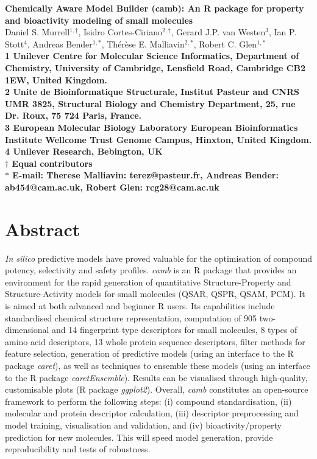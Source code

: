 \documentclass[twoside,a4wide,10pt]{article}
\date{}
\begin{document}
\begin{flushleft}
{\Large
\textbf{Chemically Aware Model Builder (camb): An R package for property and bioactivity modeling of small molecules}
}
\\

Daniel S. Murrell$^{1,\dag}$,
Isidro Cortes-Ciriano$^{2,\dag}$,
Gerard J.P. van Westen$^{3}$,
Ian P. Stott$^{4}$,
Andreas Bender$^{1,\ast}$,
Th\'er\`ese E. Malliavin$^{2,\ast}$,
Robert C. Glen$^{1,\ast}$\\

\bf{1} Unilever Centre for Molecular Science Informatics, Department of Chemistry, University of Cambridge, Lensfield Road, Cambridge CB2 1EW, United Kingdom.
\\
\bf{2} Unite de Bioinformatique Structurale, Institut Pasteur and CNRS UMR 3825, Structural Biology and Chemistry Department, 25, rue Dr. Roux, 75 724 Paris, France.
\\
\bf{3} European Molecular Biology Laboratory European Bioinformatics Institute Wellcome Trust Genome Campus, Hinxton, United Kingdom.
\\
\bf{4} Unilever Research, Bebington, UK
\\
$\dag$ Equal contributors\\
$\ast$ E-mail: Therese Malliavin: terez@pasteur.fr, Andreas Bender: ab454@cam.ac.uk, Robert Glen: rcg28@cam.ac.uk


\end{flushleft}







\section*{Abstract}

{\it In silico} predictive models have proved valuable for the optimisation of compound potency, selectivity and safety profiles.
{\it camb} is an R package that provides an environment for the rapid generation of quantitative Structure-Property and Structure-Activity models for small molecules (QSAR, QSPR, QSAM, PCM). 
It is aimed at both advanced and beginner R users.
Its capabilities include standardised chemical structure representation, computation of 905 two-dimensional and 14 fingerprint type descriptors for small molecules, 8 types of amino acid descriptors, 13 whole protein sequence descriptors, filter methods for feature selection, 
generation of predictive models (using an interface to the R package {\it caret}), as well as techniques to ensemble these models (using an interface to the R package {\it caretEnsemble}).
Results can be visualised through high-quality, customisable plots (R package {\it ggplot2}).
Overall, {\it camb} constitutes an open-source framework to perform the following steps:
 (i) compound standardisation, (ii) molecular and protein descriptor calculation, 
(iii) descriptor preprocessing and model training, visualisation and validation, 
and (iv) bioactivity/property prediction for new molecules.
This will speed model generation, provide reproducibility and tests of robustness. 
\end{document}

